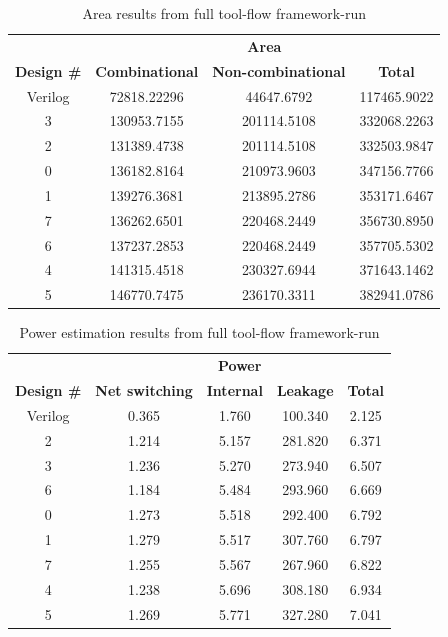 \begin{table}[hbtp]
    \centering
    \begin{tabular}{cccc}
    & \multicolumn{3}{c}{\textbf{Area}} \\
    \cline{2-4}
    \textbf{Design \#} & \textbf{Combinational} & \textbf{Non-combinational} & \textbf{Total} \\
    \toprule
    Verilog & 72818.22296 & 44647.6792 & 117465.9022 \\
    3 & 130953.7155 & 201114.5108 & 332068.2263 \\
    2 & 131389.4738 & 201114.5108 & 332503.9847 \\
    0 & 136182.8164 & 210973.9603 & 347156.7766 \\
    1 & 139276.3681 & 213895.2786 & 353171.6467 \\
    7 & 136262.6501 & 220468.2449 & 356730.8950 \\
    6 & 137237.2853 & 220468.2449 & 357705.5302 \\
    4 & 141315.4518 & 230327.6944 & 371643.1462 \\
    5 & 146770.7475 & 236170.3311 & 382941.0786 \\
    \bottomrule
    \end{tabular}
    \caption{Area results from full tool-flow framework-run}
    \label{tab:resultgraphareaframeworkrun2}
\end{table}

\begin{table}[hbtp]
    \centering
    \begin{tabular}{ccccc}
    & \multicolumn{4}{c}{\textbf{Power}} \\
    \cline{2-5}
    \textbf{Design \#} & \textbf{Net switching} & \textbf{Internal} & \textbf{Leakage} & \textbf{Total} \\
    \toprule
    Verilog & 0.365 & 1.760 & 100.340 & 2.125 \\
    2 & 1.214 & 5.157 & 281.820 & 6.371 \\
    3 & 1.236 & 5.270 & 273.940 & 6.507 \\
    6 & 1.184 & 5.484 & 293.960 & 6.669 \\
    0 & 1.273 & 5.518 & 292.400 & 6.792 \\
    1 & 1.279 & 5.517 & 307.760 & 6.797 \\
    7 & 1.255 & 5.567 & 267.960 & 6.822 \\
    4 & 1.238 & 5.696 & 308.180 & 6.934 \\
    5 & 1.269 & 5.771 & 327.280 & 7.041 \\
    \bottomrule
    \end{tabular}
    \caption{Power estimation results from full tool-flow framework-run}
    \label{tab:resultgraphpowerframeworkrun2}
\end{table}

